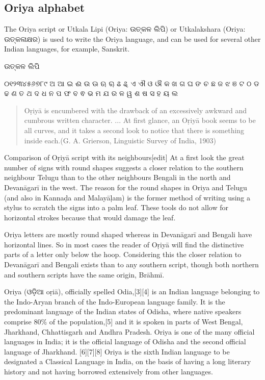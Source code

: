 \subsection{Oriya alphabet}
\newfontfamily{}

\def\oriyatext#1{{\oriya#1}}
The Oriya script or Utkala Lipi (Oriya: \oriyatext{ଉତ୍କଳ ଲିପି}) or Utkalakshara (Oriya: \oriyatext{ଉତ୍କଳାକ୍ଷର}) is used to write the Oriya language, and can be used for several other Indian languages, for example, Sanskrit.

\centerline{\Huge\oriyatext{ଉତ୍କଳ ଲିପି}}

\bgroup
\oriya
୦୧୨୩୪୫୬୭୮୯
ଅ ଆ ଇ ଈ ଉ ଊ ଋ ୠ ଌ ୡ ଏ ଐ ଓ ଔ କ ଖ ଗ ଘ ଙ ଚ ଛ ଜ ଝ ଞ ଟ ଠ ଡ ଢ ଣ ତ ଥ ଦ ଧ ନ ପ ଫ ବ ଵ ଭ ମ ଯ ର ଳ ୱ ଶ ଷ ସ ହ ୟ ଲ
\egroup

\begin{quotation}
Oṛiyā is encumbered with the drawback of an excessively awkward and cumbrous written character. ... At first glance, an Oṛiyā book seems to be all curves, and it takes a second look to notice that there is something inside each.(G. A. Grierson, Linguistic Survey of India, 1903)
\end{quotation}

Comparison of Oṛiyā script with its neighbours[edit]
At a first look the great number of signs with round shapes suggests a closer relation to the southern neighbour Telugu than to the other neighbours Bengali in the north and Devanāgarī in the west. The reason for the round shapes in Oriya and Telugu (and also in Kannaḍa and Malayāḷam) is the former method of writing using a stylus to scratch the signs into a palm leaf. These tools do not allow for horizontal strokes because that would damage the leaf.

Oriya letters are mostly round shaped whereas in Devanāgarī and Bengali have horizontal lines. So in most cases the reader of Oṛiyā will find the distinctive parts of a letter only below the hoop. Considering this the  closer relation to Devanāgarī and Bengali exists than to any southern script, though both northern and southern scripts have the same origin, Brāhmī.

Oriya (\oriyatext{ଓଡ଼ିଆ} oṛiā), officially spelled Odia,[3][4] is an Indian language belonging to the Indo-Aryan branch of the Indo-European language family. It is the predominant language of the Indian states of Odisha, where native speakers comprise 80\% of the population,[5] and it is spoken in parts of West Bengal, Jharkhand, Chhattisgarh and Andhra Pradesh. Oriya is one of the many official languages in India; it is the official language of Odisha and the second official language of Jharkhand. [6][7][8] Oriya is the sixth Indian language to be designated a Classical Language in India, on the basis of having a long literary history and not having borrowed extensively from other languages.
